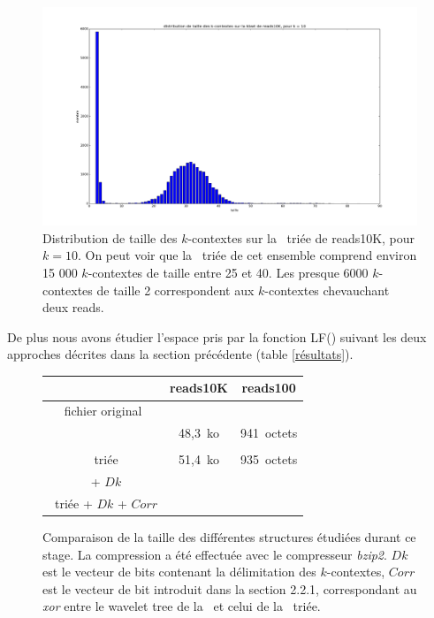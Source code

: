 \begin{figure}[!ht]
    \center
    \includegraphics[scale=0.3]{./images/distribReads10K_k10.png}
    \caption{Distribution de taille des $k$-contextes sur la \kbwt\ triée de reads10K, pour $k = 10$. On peut voir que la \kbwt\ triée de cet ensemble comprend environ 15 000 $k$-contextes de taille entre 25 et 40. Les presque 6000 $k$-contextes de taille 2 correspondent aux $k$-contextes chevauchant deux reads.}
    \label{tailleContextes}
\end{figure}

De plus nous avons étudier l'espace pris par la fonction LF() suivant les deux approches décrites dans la section précédente (table \ref{résultats}). 

\begin{figure}
\begin{tabular}{|c||c|c|}
	\hline
	 & reads10K & reads100\\ \hline \hline
	fichier original & & \\ \hline
	\bwt & 48,3~ko & 941~octets\\ \hline
	\kbwt & & \\ \hline
	\kbwt\ triée & 51,4~ko & 935~octets \\ \hline
	\kbwt\ + $Dk$ & & \\ \hline
	\kbwt\ triée + $Dk$ + $Corr$ & & \\ \hline
\end{tabular}
\caption{Comparaison de la taille des différentes structures étudiées durant ce stage. La compression a été effectuée avec le compresseur \textit{bzip2}. $Dk$ est le vecteur de bits contenant la délimitation des $k$-contextes, $Corr$ est le vecteur de bit introduit dans la section 2.2.1, correspondant au \textit{xor} entre le wavelet tree de la \kbwt\ et celui de la \kbwt\ triée.}
\label{struct}
\end{figure}
